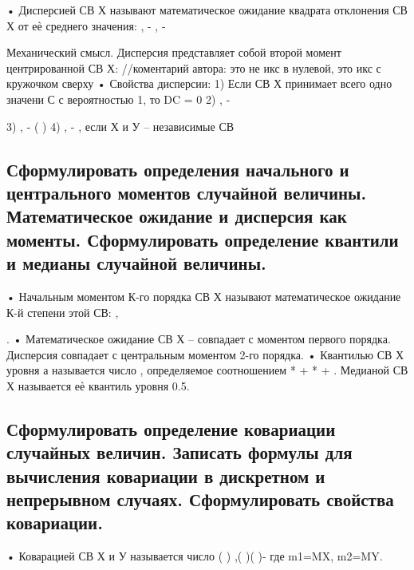 • Дисперсией СВ Х называют математическое ожидание квадрата отклонения СВ Х от еѐ среднего значения: , - , -



Механический смысл. Дисперсия представляет собой второй момент центрированной СВ Х:
//коментарий автора: это не икс в
нулевой, это икс с кружочком сверху
• Свойства дисперсии:
1) Если СВ Х принимает всего одно значени С с вероятностью 1, то DC = 0
2) , -

3) ,
- (
)
4) , - , если Х и У – независимые СВ

\subsection{Сформулировать определения начального и центрального моментов случайной величины. Математическое ожидание и дисперсия как моменты. Сформулировать определение квантили и медианы случайной величины.}

• Начальным моментом К-го порядка СВ Х называют математическое ожидание К-й степени этой СВ: ,



.
• Математическое ожидание СВ Х – совпадает с моментом первого порядка. Дисперсия совпадает с центральным моментом 2-го порядка.
• Квантилью СВ Х уровня а называется число , определяемое соотношением *
+ *
+ . Медианой СВ Х
называется еѐ квантиль уровня 0.5.

\subsection{Сформулировать определение ковариации случайных величин. Записать формулы для вычисления ковариации в дискретном и непрерывном случаях. Сформулировать свойства ковариации.}

• Коварацией СВ Х и У называется число ( ) ,( )( )- где m1=MX, m2=MY.
